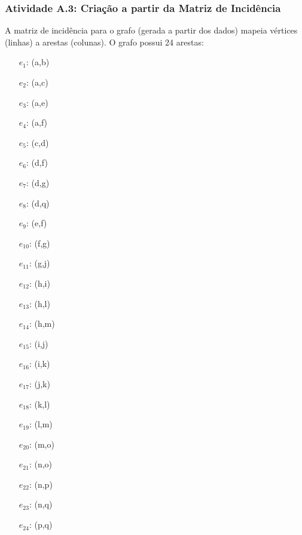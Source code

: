 \documentclass[a4paper,12pt]{article}
\begin{document}
\subsubsection*{Atividade A.3: Criação a partir da Matriz de Incidência}
A matriz de incidência para o grafo (gerada a partir dos dados) mapeia vértices (linhas) a arestas (colunas). O grafo possui 24 arestas:
\begin{multicols}{4}
\begin{itemize}[nosep, leftmargin=*]
    \item[$e_1$:] (a,b) \item[$e_2$:] (a,c) \item[$e_3$:] (a,e) \item[$e_4$:] (a,f) \item[$e_5$:] (c,d) \item[$e_6$:] (d,f)
    \item[$e_7$:] (d,g) \item[$e_8$:] (d,q) \item[$e_9$:] (e,f) \item[$e_{10}$:] (f,g) \item[$e_{11}$:] (g,j) \item[$e_{12}$:] (h,i)
    \item[$e_{13}$:] (h,l) \item[$e_{14}$:] (h,m) \item[$e_{15}$:] (i,j) \item[$e_{16}$:] (i,k) \item[$e_{17}$:] (j,k) \item[$e_{18}$:] (k,l)
    \item[$e_{19}$:] (l,m) \item[$e_{20}$:] (m,o) \item[$e_{21}$:] (n,o) \item[$e_{22}$:] (n,p) \item[$e_{23}$:] (n,q) \item[$e_{24}$:] (p,q)
\end{itemize}
\end{multicols}
\end{document}
